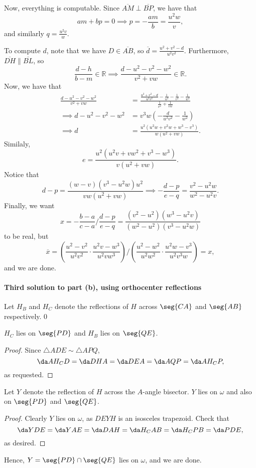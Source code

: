 Now, everything is computable. Since $\overline{AM}\perp\overline{BP}$, we have that \[am+bp=0\implies p=-\frac{am}b=\frac{u^2w}v,\]
and similarly $q=\tfrac{u^2v}w$.

To compute $d$, note that we have $D\in\overline{AB}$, so $\overline d=\tfrac{u^2+v^2-d}{u^2v^2}$. Furthermore, $\overline{DH}\parallel\overline{BL}$, so \[\frac{d-h}{b-m}\in\mathbb R\implies\frac{d-u^2-v^2-w^2}{v^2+vw}\in\mathbb R.\]
Now, we have that
\begin{align*}
    \frac{d-u^2-v^2-w^2}{v^2+vw}&=\frac{\frac{u^2+v^2-d}{u^2v^2}-\frac1{u^2}-\frac1{v^2}-\frac1{w^2}}{\frac1{v^2}+\frac1{vw}}\\
    \implies d-u^2-v^2-w^2&=v^3w\left(-\frac d{u^2v^2}-\frac1{w^2}\right)\\
    \implies d&=\frac{u^2\left(u^2w+v^2w+w^3-v^3\right)}{w\left(u^2+vw\right)}.
\end{align*}
Similaly, \[e=\frac{u^2\left(u^2v+vw^2+v^3-w^3\right)}{v\left(u^2+vw\right)}.\]
Notice that \[d-p=\frac{(w-v)\left(v^3-u^2w\right)u^2}{vw\left(u^2+vw\right)}\implies-\frac{d-p}{e-q}=\frac{v^2-u^2w}{w^2-u^2v}.\]
Finally, we want \[x=-\frac{b-a}{c-a}\bigg/\frac{d-p}{e-q}=\frac{\left(v^2-u^2\right)\left(w^3-u^2v\right)}{\left(w^2-u^2\right)\left(v^3-u^2w\right)}\]
to be real, but \[\overline x=\left(\frac{u^2-v^2}{u^2v^2}\cdot\frac{u^2v-w^3}{u^2vw^3}\right)\bigg/\left(\frac{u^2-w^2}{u^2w^2}\cdot\frac{u^2w-v^3}{u^2v^3w}\right)=x,\]
and we are done. 

\paragraph{Third solution to part (b), using orthocenter reflections}     Let $H_B$ and $H_C$ denote the reflections of $H$ across $\seg{CA}$ and $\seg{AB}$ respectively.
\setcounter{claim}0
\begin{claim}
    $H_C$ lies on $\seg{PD}$ and $H_B$ lies on $\seg{QE}$.
\end{claim}
\begin{proof}
    Since $\triangle ADE\sim\triangle APQ$, \[\da AH_CD=\da DHA=\da DEA=\da AQP=\da AH_CP,\]
    as requested.
\end{proof}
\begin{claim}
    Let $Y$ denote the reflection of $H$ across the $A$-angle bisector. $Y$ lies on $\omega$ and also on $\seg{PD}$ and $\seg{QE}$.
\end{claim}
\begin{proof}
    Clearly $Y$ lies on $\omega$, as $DEYH$ is an isosceles trapezoid. Check that \[\da YDE=\da YAE=\da DAH=\da H_CAB=\da H_CPB=\da PDE,\]
    as desired.
\end{proof}

Hence, $Y=\seg{PD}\cap\seg{QE}$ lies on $\omega$, and we are done. 

